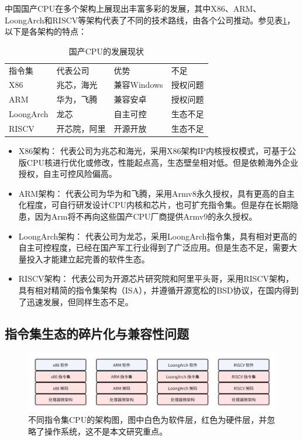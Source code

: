 \documentclass{Style/ucasproposal}%
\begin{document}
中国国产CPU在多个架构上展现出丰富多彩的发展，其中X86、ARM、LoongArch和RISCV等架构代表了不同的技术路线，由各个公司推动。参见表\ref{tab:CPUs}，以下是各架构的特点：

\begin{table}[]
\centering
\caption{国产CPU的发展现状}
\label{tab:CPUs}
    \begin{tabular}{llll}
    \rowcolor[HTML]{FBE5D6} 
    指令集       & 代表公司   & 优势        & 不足         \\
    X86       & 兆芯，海光  & 兼容Windows & 授权问题 \\
    ARM       & 华为，飞腾  & 兼容安卓      & 授权问题       \\
    LoongArch & 龙芯     & 自主可控      & 生态不足       \\
    RISCV     & 开芯院，阿里 & 开源开放      & 生态不足      
    \end{tabular}
    \end{table}


    \begin{itemize}
    \item {X86架构： } 代表公司为兆芯和海光，采用X86架构IP内核授权模式，可基于公版CPU核进行优化或修改，性能起点高，生态壁垒相对低。但是依赖海外企业授权，自主可控风险偏高。
    
    \item{ARM架构：} 代表公司为华为和飞腾，采用Armv8永久授权，具有更高的自主化程度，可自行研发设计CPU内核和芯片，也可扩充指令集。但是存在长期隐患，因为Arm将不再向这些国产CPU厂商提供Armv9的永久授权。
    
    \item{LoongArch架构：} 代表公司为龙芯，采用LoongArch指令集，具有相对更高的自主可控程度，已经在国产军工行业得到了广泛应用。但是生态不足，需要大量投入才能建立起完善的软件生态。
    
    \item{RISCV架构：} 代表公司为开源芯片研究院和阿里平头哥，采用RISCV架构，具有相对精简的指令集架构（ISA），并遵循开源宽松的BSD协议，在国内得到了迅速发展，但同样生态不足。
    \end{itemize}


\subsection{指令集生态的碎片化与兼容性问题}

\begin{figure}[h]
    \centering
    \includegraphics[width=1\linewidth]{./feishuImage/allCPU_arch.png}
    \caption{不同指令集CPU的架构图，图中白色为软件层，红色为硬件层，并忽略了操作系统，这不是本文研究重点。\protect\footnotemark}
    \label{img:allCPU_arch}
  \end{figure}
\end{document}
